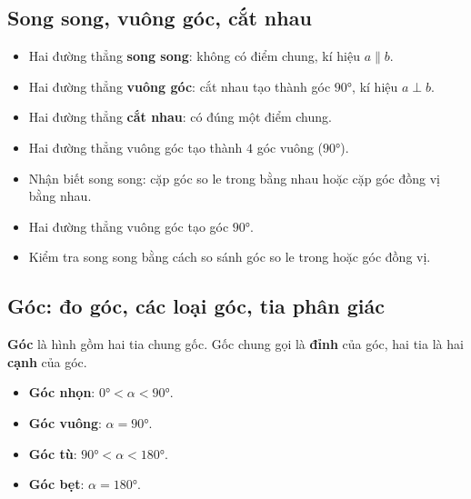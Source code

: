 \documentclass[12pt,a4paper]{article}
\begin{document}
\subsection{Song song, vuông góc, cắt nhau}

\begin{dinhnghia}
\begin{itemize}
  \item Hai đường thẳng \textbf{song song}: không có điểm chung, kí hiệu $a \parallel b$.
  \item Hai đường thẳng \textbf{vuông góc}: cắt nhau tạo thành góc $90°$, kí hiệu $a \perp b$.
  \item Hai đường thẳng \textbf{cắt nhau}: có đúng một điểm chung.
\end{itemize}
\end{dinhnghia}

\begin{tinhchat}
\begin{itemize}
  \item Hai đường thẳng vuông góc tạo thành $4$ góc vuông ($90°$).
  \item Nhận biết song song: cặp góc so le trong bằng nhau hoặc cặp góc đồng vị bằng nhau.
\end{itemize}
\end{tinhchat}

\begin{vidu}
\begin{itemize}
  \item Hai đường thẳng vuông góc tạo góc $90°$.
  \item Kiểm tra song song bằng cách so sánh góc so le trong hoặc góc đồng vị.
\end{itemize}
\end{vidu}

\subsection{Góc: đo góc, các loại góc, tia phân giác}

\begin{dinhnghia}
\textbf{Góc} là hình gồm hai tia chung gốc. Gốc chung gọi là \textbf{đỉnh} của góc, hai tia là hai \textbf{cạnh} của góc.
\end{dinhnghia}

\begin{tinhchat}[title={Phân loại góc}]
\begin{itemize}
  \item \textbf{Góc nhọn}: $0° < \alpha < 90°$.
  \item \textbf{Góc vuông}: $\alpha = 90°$.
  \item \textbf{Góc tù}: $90° < \alpha < 180°$.
  \item \textbf{Góc bẹt}: $\alpha = 180°$.
\end{itemize}
\end{tinhchat}
\end{document}
